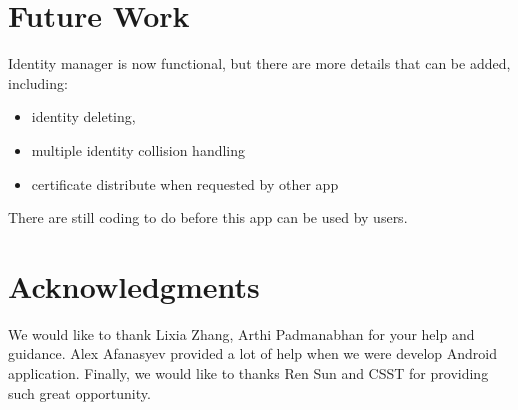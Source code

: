 \documentclass[a0,portrait]{poster}
\begin{document}
\begin{multicols}{2}





\section*{Future Work}

\par 
	Identity manager is now functional, but there are more details that can be added, including:
	\begin{itemize}
		\item identity deleting, 
		\item multiple identity collision handling
		\item certificate distribute when requested by other app
	\end{itemize} 
	There are still coding to do before this app can be used by users.


\nocite{*} %


\section*{Acknowledgments}

We would like to thank Lixia Zhang, Arthi Padmanabhan for your help and guidance. Alex Afanasyev provided a lot of help when we were develop Android application. Finally, we would like to thanks Ren Sun and CSST for providing such great opportunity.

\end{multicols}
\end{document}
